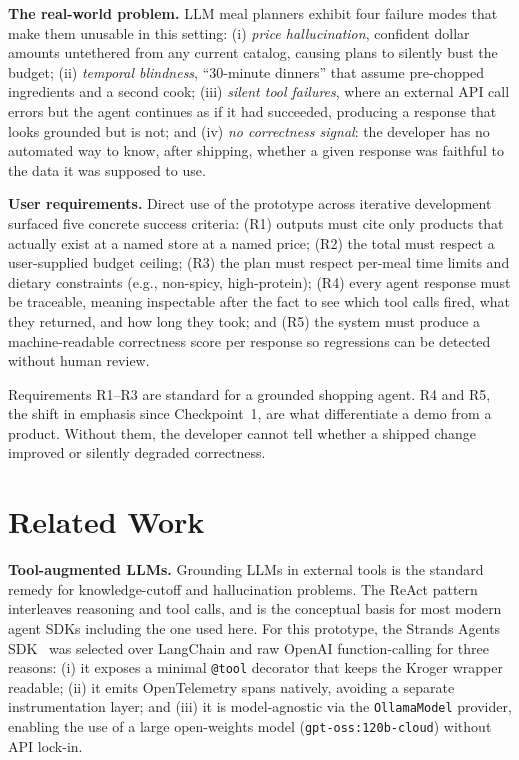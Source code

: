 \documentclass{article}
\begin{document}
\textbf{The real-world problem.} LLM meal planners exhibit four failure modes that make them unusable in this setting: (i) \emph{price hallucination}, confident dollar amounts untethered from any current catalog, causing plans to silently bust the budget; (ii) \emph{temporal blindness}, ``30-minute dinners'' that assume pre-chopped ingredients and a second cook; (iii) \emph{silent tool failures}, where an external API call errors but the agent continues as if it had succeeded, producing a response that looks grounded but is not; and (iv) \emph{no correctness signal}: the developer has no automated way to know, after shipping, whether a given response was faithful to the data it was supposed to use.

\textbf{User requirements.} Direct use of the prototype across iterative development surfaced five concrete success criteria: (R1) outputs must cite only products that actually exist at a named store at a named price; (R2) the total must respect a user-supplied budget ceiling; (R3) the plan must respect per-meal time limits and dietary constraints (e.g., non-spicy, high-protein); (R4) every agent response must be traceable, meaning inspectable after the fact to see which tool calls fired, what they returned, and how long they took; and (R5) the system must produce a machine-readable correctness score per response so regressions can be detected without human review.

Requirements R1--R3 are standard for a grounded shopping agent. R4 and R5, the shift in emphasis since Checkpoint~1, are what differentiate a demo from a product. Without them, the developer cannot tell whether a shipped change improved or silently degraded correctness.

\section{Related Work}

\textbf{Tool-augmented LLMs.} Grounding LLMs in external tools is the standard remedy for knowledge-cutoff and hallucination problems. The ReAct pattern~\citep{yao2023react} interleaves reasoning and tool calls, and is the conceptual basis for most modern agent SDKs including the one used here. For this prototype, the Strands Agents SDK~\citep{strands2025} was selected over LangChain and raw OpenAI function-calling for three reasons: (i) it exposes a minimal \texttt{@tool} decorator that keeps the Kroger wrapper readable; (ii) it emits OpenTelemetry spans natively, avoiding a separate instrumentation layer; and (iii) it is model-agnostic via the \texttt{OllamaModel} provider, enabling the use of a large open-weights model (\texttt{gpt-oss:120b-cloud}) without API lock-in.
\end{document}

